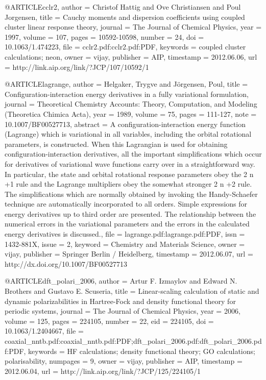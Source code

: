 @ARTICLE{cclr2,
  author = {Christof Hattig and Ove Christiansen and Poul Jorgensen},
  title = {Cauchy moments and dispersion coefficients using coupled cluster
	linear response theory},
  journal = {The Journal of Chemical Physics},
  year = {1997},
  volume = {107},
  pages = {10592-10598},
  number = {24},
  doi = {10.1063/1.474223},
  file = {cclr2.pdf:cclr2.pdf:PDF},
  keywords = {coupled cluster calculations; neon},
  owner = {vijay},
  publisher = {AIP},
  timestamp = {2012.06.06},
  url = {http://link.aip.org/link/?JCP/107/10592/1}
}

@ARTICLE{lagrange,
  author = {Helgaker, Trygve and J{\"o}rgensen, Poul},
  title = {Configuration-interaction energy derivatives in a fully variational
	formulation},
  journal = {Theoretical Chemistry Accounts: Theory, Computation, and Modeling
	(Theoretica Chimica Acta)},
  year = {1989},
  volume = {75},
  pages = {111-127},
  note = {10.1007/BF00527713},
  abstract = {A configuration-interaction energy function (Lagrange) which is variational
	in all variables, including the orbital rotational parameters, is
	constructed. When this Lagrangian is used for obtaining configuration-interaction
	derivatives, all the important simplifications which occur for derivatives
	of variational wave functions carry over in a straightforward way.
	In particular, the state and orbital rotational response parameters
	obey the 2 n +1 rule and the Lagrange multipliers obey the somewhat
	stronger 2 n +2 rule. The simplifications which are normally obtained
	by invoking the Handy-Schaefer technique are automatically incorporated
	to all orders. Simple expressions for energy derivatives up to third
	order are presented. The relationship between the numerical errors
	in the variational parameters and the errors in the calculated energy
	derivatives is discussed.},
  file = {lagrange.pdf:lagrange.pdf:PDF},
  issn = {1432-881X},
  issue = {2},
  keyword = {Chemistry and Materials Science},
  owner = {vijay},
  publisher = {Springer Berlin / Heidelberg},
  timestamp = {2012.06.07},
  url = {http://dx.doi.org/10.1007/BF00527713}
}

@ARTICLE{dft_polari_2006,
  author = {Artur F. Izmaylov and Edward N. Brothers and Gustavo E. Scuseria},
  title = {Linear-scaling calculation of static and dynamic polarizabilities
	in Hartree-Fock and density functional theory for periodic systems},
  journal = {The Journal of Chemical Physics},
  year = {2006},
  volume = {125},
  pages = {224105},
  number = {22},
  eid = {224105},
  doi = {10.1063/1.2404667},
  file = {coaxial_nntb.pdf:coaxial_nntb.pdf:PDF;dft_polari_2006.pdf:dft_polari_2006.pdf:PDF},
  keywords = {HF calculations; density functional theory; GO calculations; polarisability},
  numpages = {9},
  owner = {vijay},
  publisher = {AIP},
  timestamp = {2012.06.04},
  url = {http://link.aip.org/link/?JCP/125/224105/1}
}

